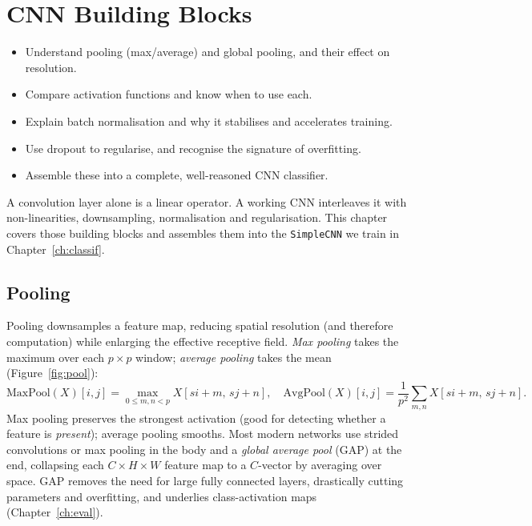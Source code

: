 \chapter{CNN Building Blocks}
\label{ch:blocks}


\begin{objbox}
\begin{itemize}[leftmargin=1.2em,nosep]
  \item Understand pooling (max/average) and global pooling, and their effect on resolution.
  \item Compare activation functions and know when to use each.
  \item Explain batch normalisation and why it stabilises and accelerates training.
  \item Use dropout to regularise, and recognise the signature of overfitting.
  \item Assemble these into a complete, well-reasoned CNN classifier.
\end{itemize}
\end{objbox}

A convolution layer alone is a linear operator. A working CNN interleaves it
with non-linearities, downsampling, normalisation and regularisation. This
chapter covers those building blocks and assembles them into the
\texttt{SimpleCNN} we train in Chapter~\ref{ch:classif}.

\section{Pooling}

Pooling downsamples a feature map, reducing spatial resolution (and therefore
computation) while enlarging the effective receptive field. \emph{Max pooling}
takes the maximum over each $p\times p$ window; \emph{average pooling} takes the
mean (Figure~\ref{fig:pool}):
\begin{equation}
\mathrm{MaxPool}(X)[i,j]=\!\!\max_{0\le m,n<p}\! X[si+m,\,sj+n],\quad
\mathrm{AvgPool}(X)[i,j]=\frac{1}{p^2}\!\sum_{m,n} X[si+m,\,sj+n].
\end{equation}
Max pooling preserves the strongest activation (good for detecting whether a
feature is \emph{present}); average pooling smooths. Most modern networks use
strided convolutions or max pooling in the body and a \emph{global average
pool} (GAP) at the end, collapsing each $C\times H\times W$ feature map to a
$C$-vector by averaging over space. GAP removes the need for large fully
connected layers, drastically cutting parameters and overfitting, and underlies
class-activation maps (Chapter~\ref{ch:eval}).

